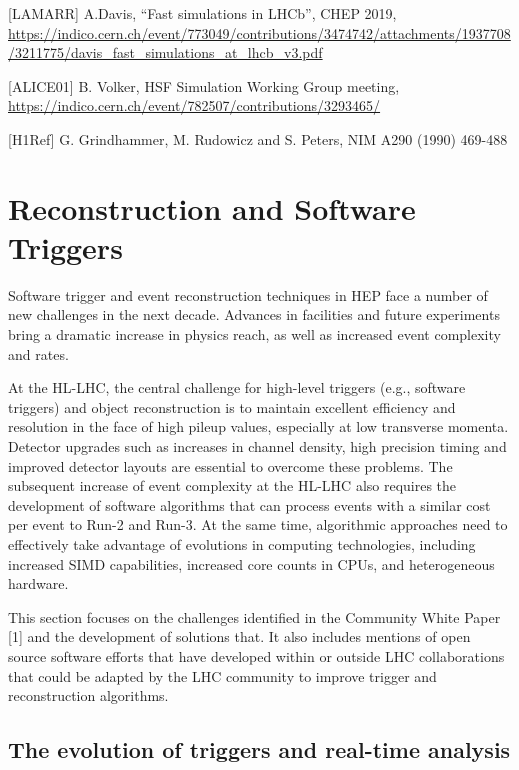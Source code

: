\documentclass[10pt,a4paper]{article}
\begin{document}
{[}LAMARR{]} A.Davis, ``Fast simulations in LHCb'', CHEP 2019,
\href{https://indico.cern.ch/event/773049/contributions/3474742/attachments/1937708/3211775/davis_fast_simulations_at_lhcb_v3.pdf}{{https://indico.cern.ch/event/773049/contributions/3474742/attachments/1937708/3211775/davis\_fast\_simulations\_at\_lhcb\_v3.pdf}}

{[}ALICE01{]} B. Volker, HSF Simulation Working Group meeting,
\href{https://indico.cern.ch/event/782507/contributions/3293465/}{{https://indico.cern.ch/event/782507/contributions/3293465/}}

{[}H1Ref{]} G. Grindhammer, M. Rudowicz and S. Peters, NIM A290 (1990)
469-488

\hypertarget{reconstruction-and-software-triggers}{%
\section{Reconstruction and Software
Triggers}\label{reconstruction-and-software-triggers}}

Software trigger and event reconstruction techniques in HEP face a
number of new challenges in the next decade. Advances in facilities and
future experiments bring a dramatic increase in physics reach, as well
as increased event complexity and rates.

At the HL-LHC, the central challenge for high-level triggers (e.g.,
software triggers) and object reconstruction is to maintain excellent
efficiency and resolution in the face of high pileup values, especially
at low transverse momenta. Detector upgrades such as increases in
channel density, high precision timing and improved detector layouts are
essential to overcome these problems. The subsequent increase of event
complexity at the HL-LHC also requires the development of software
algorithms that can process events with a similar cost per event to
Run-2 and Run-3. At the same time, algorithmic approaches need to
effectively take advantage of evolutions in computing technologies,
including increased SIMD capabilities, increased core counts in CPUs,
and heterogeneous hardware.

This section focuses on the challenges identified in the Community White
Paper {[}1{]} and the development of solutions that. It also includes
mentions of open source software efforts that have developed within or
outside LHC collaborations that could be adapted by the LHC community to
improve trigger and reconstruction algorithms.

\hypertarget{the-evolution-of-triggers-and-real-time-analysis}{%
\subsection{\texorpdfstring{The evolution of triggers and real-time
analysis
}{The evolution of triggers and real-time analysis }}\label{the-evolution-of-triggers-and-real-time-analysis}}
\end{document}
